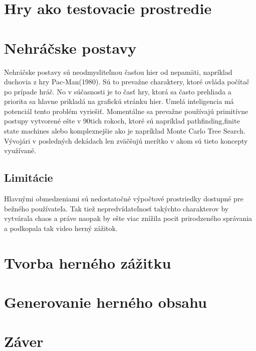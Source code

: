 \documentclass{article}
\begin{document}
\section{Hry ako testovacie prostredie}

\section{Nehráčske postavy}

Nehráčske postavy sú neodmysliteľnou časťou hier od nepamäti, napríklad duchovia z hry Pac-Man(1980). Sú to prevažne charaktery, ktoré ovláda počítač po prípade hráč. No v súčasnosti je to časť hry, ktorá sa často prehliada a priorita sa hlavne prikladá na grafickú stránku hier. Umelá inteligencia má potenciál tento problém vyriešiť. Momentálne sa prevažne používajú primitívne postupy vytvorené ešte v 90tich rokoch, ktoré sú napríklad pathfinding,finite state machines alebo komplexnejšie ako je napríklad Monte Carlo Tree Search. Vývojári v posledných dekádach len zväčšujú merítko v akom sú tieto koncepty využívané.

\subsection{Limitácie}

Hlavnými obmedzeniami sú nedostatočné výpočtové prostriedky dostupné pre bežného používateľa. Tak tiež nepredvídateľnosť takýchto charakterov by vytvárala chaos a práve naopak by ešte viac znížila pocit prirodzeného správania a podkopala tak video herný zážitok.

\section{Tvorba herného zážitku}

\section{Generovanie herného obsahu}
\section{Záver}



\end{document}

